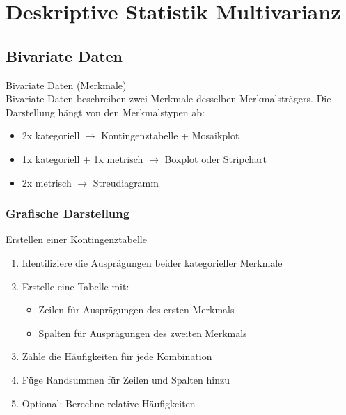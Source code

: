 \section{Deskriptive Statistik Multivarianz}

\subsection{Bivariate Daten}

\begin{definition}{Bivariate Daten (Merkmale)}\\
Bivariate Daten beschreiben zwei Merkmale desselben Merkmalsträgers. Die Darstellung hängt von den Merkmalstypen ab:
\begin{itemize}
  \item 2x kategoriell $\rightarrow$ Kontingenztabelle + Mosaikplot
  \item 1x kategoriell + 1x metrisch $\rightarrow$ Boxplot oder Stripchart
  \item 2x metrisch $\rightarrow$ Streudiagramm
\end{itemize}
\end{definition}

\subsubsection{Grafische Darstellung}

\begin{KR}{Erstellen einer Kontingenztabelle} %
\begin{enumerate}
    \item Identifiziere die Ausprägungen beider kategorieller Merkmale
    \item Erstelle eine Tabelle mit:
        \begin{itemize}
            \item Zeilen für Ausprägungen des ersten Merkmals
            \item Spalten für Ausprägungen des zweiten Merkmals
        \end{itemize}
    \item Zähle die Häufigkeiten für jede Kombination
    \item Füge Randsummen für Zeilen und Spalten hinzu
    \item Optional: Berechne relative Häufigkeiten
\end{enumerate}
\end{KR}

